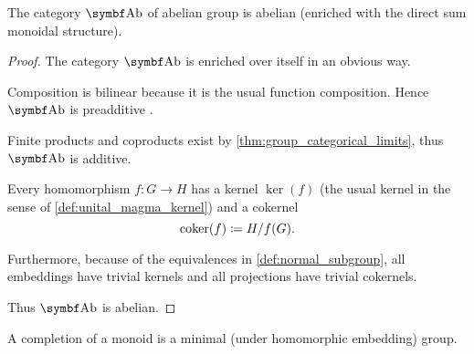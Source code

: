 \begin{proposition}\label{thm:ab_is_abelian}
  The category \( \Cat{Ab} \) of abelian group is abelian (enriched with the direct sum monoidal structure).
\end{proposition}
\begin{proof}
  The category \( \Cat{Ab} \) is enriched over itself in an obvious way.

  Composition is bilinear because it is the usual function composition. Hence \( \Cat{Ab} \) is preadditive .

  Finite products and coproducts exist by \cref{thm:group_categorical_limits}, thus \( \Cat{Ab} \) is additive.

  Every homomorphism \( f: G \to H \) has a kernel \( \ker(f) \) (the usual kernel in the sense of \cref{def:unital_magma_kernel}) and a cokernel
  \begin{equation*}
    \operatorname{coker}(f) \coloneqq H / f(G).
  \end{equation*}

  Furthermore, because of the equivalences in \cref{def:normal_subgroup}, all embeddings have trivial kernels and all projections have trivial cokernels.

  Thus \( \Cat{Ab} \) is abelian.
\end{proof}

\begin{definition}\label{def:monoid_completion}
  A completion of a monoid is a minimal (under homomorphic embedding) group.
\end{definition}

